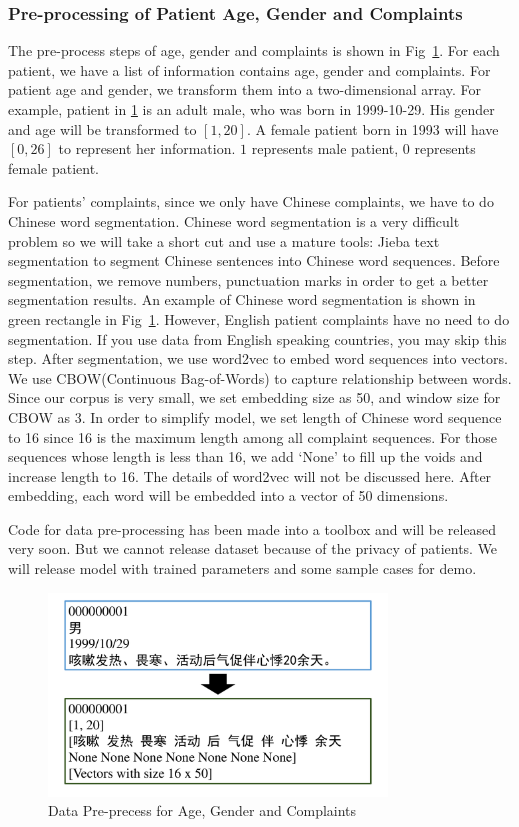 \documentclass[journal]{IEEEtran}
\begin{document}
\subsubsection{Pre-processing of Patient Age, Gender and Complaints}
\label{textdata}
The pre-process steps of age, gender and complaints is shown in Fig~\ref{textinfo}. For each patient, we have a list of information contains age, gender and complaints. 
For patient age and gender, we transform them into a two-dimensional array. For example, patient in \ref{textinfo} is an adult male, who was born in 1999-10-29. His gender and age will be transformed to $[1, 20]$. A female patient born in 1993 will have $[0, 26]$ to represent her information. $1$ represents male patient, $0$ represents female patient.

For patients' complaints, since we only have Chinese complaints, we have to do Chinese word segmentation. Chinese word segmentation is a very difficult problem so we will take a short cut and use a mature tools: Jieba text segmentation to segment Chinese sentences into Chinese word sequences. Before segmentation, we remove numbers, punctuation marks in order to get a better segmentation results. An example of Chinese word segmentation is shown in green rectangle in Fig~\ref{textinfo}. However, English patient complaints have no need to do segmentation. If you use data from English speaking countries, you may skip this step.
After segmentation, we use word2vec to embed word sequences into vectors. We use CBOW(Continuous Bag-of-Words)\cite{mikolov2013efficient} to capture relationship between words. Since our corpus is very small, we set embedding size as 50, and window size for CBOW as 3. In order to simplify model, we set length of Chinese word sequence to 16 since 16 is the maximum length among all complaint sequences. For those sequences whose length is less than 16, we add `None' to fill up the voids and increase  length to 16. The details of word2vec will not be discussed here. After embedding, each word will be embedded into a vector of 50 dimensions.

Code for data pre-processing has been made into a toolbox and will be released very soon. But we cannot release dataset because of the privacy of patients. We will release model with trained parameters and some sample cases for demo.
\begin{figure}[!t]
    \centerline{\includegraphics[width=90mm]{textinfo.pdf}}
    \vspace{-0cm}
    \caption{Data Pre-precess for Age, Gender and Complaints}
    \vspace{-0cm}
    \label{textinfo}
    \end{figure}
\end{document}
